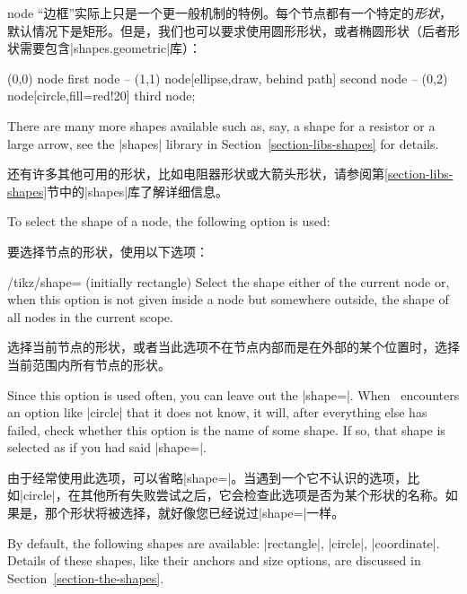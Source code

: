 \begin{pathoperation}{node}
    “边框”实际上只是一个更一般机制的特例。每个节点都有一个特定的\emph{形状}，默认情况下是矩形。但是，我们也可以要求\tikzname 使用圆形形状，或者椭圆形状（后者形状需要包含|shapes.geometric|库）：

\begin{codeexample}[preamble={\usetikzlibrary{shapes.geometric}}]
\tikz \fill[fill=yellow!80!black]
      (0,0) node                            {first node}
   -- (1,1) node[ellipse,draw, behind path] {second node}
   -- (0,2) node[circle,fill=red!20]        {third node};
\end{codeexample}

    There are many more shapes available such as, say, a shape for a resistor
    or a large arrow, see the |shapes| library in
    Section~\ref{section-libs-shapes} for details.

    还有许多其他可用的形状，比如电阻器形状或大箭头形状，请参阅第\ref{section-libs-shapes}节中的|shapes|库了解详细信息。



    To select the shape of a node, the following option is used:

    要选择节点的形状，使用以下选项：

    \begin{key}{/tikz/shape= (initially rectangle)}
        Select the shape either of the current node or, when this option is not
        given inside a node but somewhere outside, the shape of all nodes in
        the current scope.%

        选择当前节点的形状，或者当此选项不在节点内部而是在外部的某个位置时，选择当前范围内所有节点的形状。

        Since this option is used often, you can leave out the |shape=|. When
        \tikzname\ encounters an option like |circle| that it does not know, it
        will, after everything else has failed, check whether this option is
        the name of some shape. If so, that shape is selected as if you had
        said |shape=|.

        由于经常使用此选项，可以省略|shape=|。当\tikzname 遇到一个它不认识的选项，比如|circle|，在其他所有失败尝试之后，它会检查此选项是否为某个形状的名称。如果是，那个形状将被选择，就好像您已经说过|shape=|一样。

        By default, the following shapes are available: |rectangle|, |circle|,
        |coordinate|. Details of these shapes, like their anchors and size
        options, are discussed in Section~\ref{section-the-shapes}.


\end{key}
\end{pathoperation}
